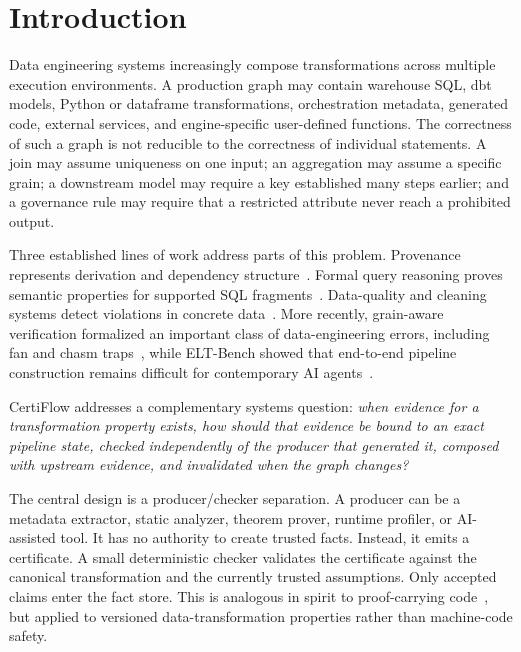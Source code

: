 \section{Introduction}

Data engineering systems increasingly compose transformations across multiple execution environments. A production graph may contain warehouse SQL, dbt models, Python or dataframe transformations, orchestration metadata, generated code, external services, and engine-specific user-defined functions. The correctness of such a graph is not reducible to the correctness of individual statements. A join may assume uniqueness on one input; an aggregation may assume a specific grain; a downstream model may require a key established many steps earlier; and a governance rule may require that a restricted attribute never reach a prohibited output.

Three established lines of work address parts of this problem. Provenance represents derivation and dependency structure~\cite{buneman2001whywhere,green2007provenance,herschel2017survey,rupprecht2020provenance}. Formal query reasoning proves semantic properties for supported SQL fragments~\cite{chu2017hottsql,chu2017axiomatic}. Data-quality and cleaning systems detect violations in concrete data~\cite{ilyas2019datacleaning}. More recently, grain-aware verification formalized an important class of data-engineering errors, including fan and chasm traps~\cite{karayannidis2026grain}, while ELT-Bench showed that end-to-end pipeline construction remains difficult for contemporary AI agents~\cite{jin2025eltbench}.

CertiFlow addresses a complementary systems question: \emph{when evidence for a transformation property exists, how should that evidence be bound to an exact pipeline state, checked independently of the producer that generated it, composed with upstream evidence, and invalidated when the graph changes?}

The central design is a producer/checker separation. A producer can be a metadata extractor, static analyzer, theorem prover, runtime profiler, or AI-assisted tool. It has no authority to create trusted facts. Instead, it emits a certificate. A small deterministic checker validates the certificate against the canonical transformation and the currently trusted assumptions. Only accepted claims enter the fact store. This is analogous in spirit to proof-carrying code~\cite{necula1997pcc}, but applied to versioned data-transformation properties rather than machine-code safety.


